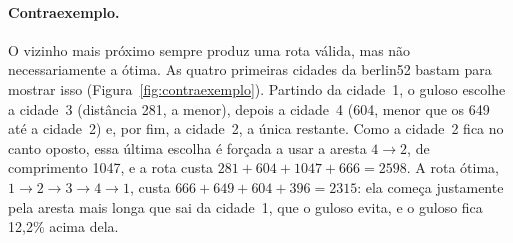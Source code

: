 \documentclass[12pt,a4paper]{article}
\begin{document}
\paragraph{Contraexemplo.} O vizinho mais próximo sempre produz uma rota válida, mas não necessariamente a ótima. As quatro primeiras cidades da berlin52 bastam para mostrar isso (Figura~\ref{fig:contraexemplo}). Partindo da cidade~1, o guloso escolhe a cidade~3 (distância 281, a menor), depois a cidade~4 (604, menor que os 649 até a cidade~2) e, por fim, a cidade~2, a única restante. Como a cidade~2 fica no canto oposto, essa última escolha é forçada a usar a aresta $4 \to 2$, de comprimento 1047, e a rota custa $281 + 604 + 1047 + 666 = 2598$. A rota ótima, $1 \to 2 \to 3 \to 4 \to 1$, custa $666 + 649 + 604 + 396 = 2315$: ela começa justamente pela aresta mais longa que sai da cidade~1, que o guloso evita, e o guloso fica 12,2\% acima dela.
\end{document}
